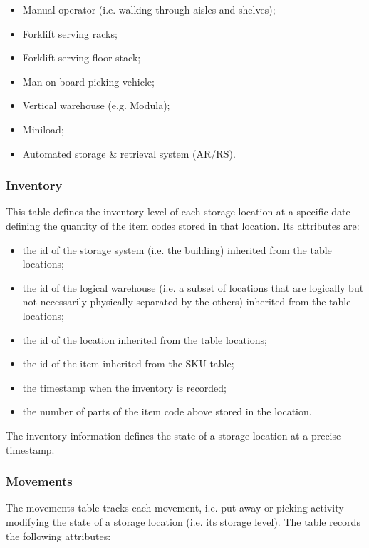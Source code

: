 \begin{itemize}
    \item Manual operator (i.e. walking through aisles and shelves);
    \item Forklift serving racks;
    \item Forklift serving floor stack;
    \item Man-on-board picking vehicle;
    \item Vertical warehouse (e.g. Modula);
    \item Miniload;
    \item Automated storage \& retrieval system (AR/RS).

\end{itemize}

\subsubsection{Inventory}
This table defines the inventory level of each storage location at a specific date defining the quantity of the item codes stored in that location. Its attributes are:

\begin{itemize}
    \item the id of the storage system (i.e. the building) inherited from the table locations;
    \item the id of the logical warehouse (i.e. a subset of locations that are logically but not necessarily physically separated by the others) inherited from the table locations;
    \item the id of the location inherited from the table locations;
    \item the id of the item inherited from the SKU table;
    \item the timestamp when the inventory is recorded;
    \item the number of parts of the item code above stored in the location.

\end{itemize}

The inventory information defines the state of a storage location at a precise timestamp.

\subsubsection{Movements}
The movements table tracks each movement, i.e. put-away or picking activity modifying the state of a storage location (i.e. its storage level). The table records the following attributes:

